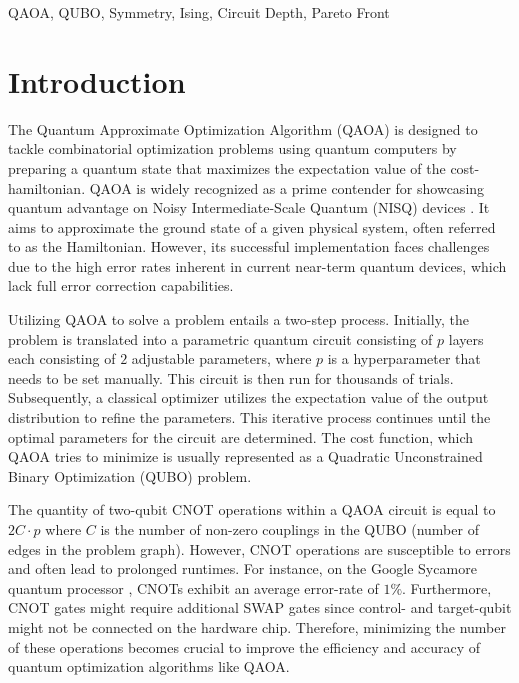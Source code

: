 \documentclass[conference]{IEEEtran}
\theoremstyle{plain}
\theoremstyle{definition}
\theoremstyle{remark}
\begin{document}
\begin{IEEEkeywords}
QAOA, QUBO, Symmetry, Ising, Circuit Depth, Pareto Front
\end{IEEEkeywords}

\section{Introduction}

The Quantum Approximate Optimization Algorithm (QAOA) \cite{farhi2014quantum} is designed to tackle combinatorial optimization problems using quantum computers by preparing a quantum state that maximizes the expectation value of the cost-hamiltonian. QAOA is widely recognized as a prime contender for showcasing quantum advantage on Noisy Intermediate-Scale Quantum (NISQ) devices \cite{zou2023multiscale}. It aims to approximate the ground state of a given physical system, often referred to as the Hamiltonian. However, its successful implementation faces challenges due to the high error rates inherent in current near-term quantum devices, which lack full error correction capabilities.

Utilizing QAOA to solve a problem entails a two-step process. Initially, the problem is translated into a parametric quantum circuit consisting of $p$ layers each consisting of $2$ adjustable parameters, where $p$ is a hyperparameter that needs to be set manually. This circuit is then run for thousands of trials. Subsequently, a classical optimizer utilizes the expectation value of the output distribution to refine the parameters. This iterative process continues until the optimal parameters for the circuit are determined. The cost function, which QAOA tries to minimize is usually represented as a Quadratic Unconstrained Binary Optimization (QUBO) problem.

The quantity of two-qubit CNOT operations within a QAOA circuit is equal to $2C \cdot p$ where $C$ is the number of non-zero couplings in the QUBO (number of edges in the problem graph). However, CNOT operations are susceptible to errors and often lead to prolonged runtimes. For instance, on the Google Sycamore quantum processor \cite{ayanzadeh2023frozenqubits}, CNOTs exhibit an average error-rate of $1\%$. Furthermore, CNOT gates might require additional SWAP gates since control- and target-qubit might not be connected on the hardware chip. Therefore, minimizing the number of these operations becomes crucial to improve the efficiency and accuracy of quantum optimization algorithms like QAOA.
\end{document}
